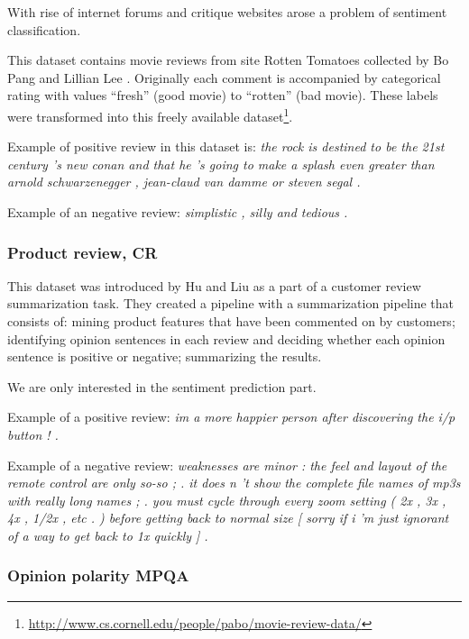     With rise of internet forums and critique websites arose a problem of sentiment classification.
    
    This dataset contains movie reviews from site Rotten Tomatoes collected by Bo Pang and Lillian Lee \cite{pang2002thumbs}.
    Originally each comment is accompanied by categorical rating with values ``fresh'' (good movie) to ``rotten'' (bad movie). 
    These labels were transformed into this freely available dataset\footnote{\url{http://www.cs.cornell.edu/people/pabo/movie-review-data/}}.
    
    Example of positive review in this dataset is: \emph{the rock is destined to be the 21st century 's new conan and that he 's going to make a splash even greater than arnold schwarzenegger , jean-claud van damme or steven segal .}

    Example of an negative review: \emph{simplistic , silly and tedious .}
    
    \subsubsection{Product review, CR}
    
    This dataset was introduced by Hu and Liu \cite{hu2004mining} as a part of a customer review summarization task. \* %
    They created a pipeline with a summarization pipeline that consists of: mining product features that have been commented on by customers; identifying opinion sentences in each review and deciding whether each opinion sentence is positive or negative;  summarizing  the  results.  
    
    We are only interested in the sentiment prediction part.
    
    Example of a positive review:
    \emph{im a more happier person after discovering the i/p button ! .}

    Example of a negative review:
    \emph{weaknesses are minor : the feel and layout of the remote control are only so-so ; . it does n 't show the complete file names of mp3s with really long names ; . you must cycle through every zoom setting ( 2x , 3x , 4x , 1/2x , etc . ) before getting back to normal size [ sorry if i 'm just ignorant of a way to get back to 1x quickly ] .}

    \subsubsection{Opinion polarity MPQA}

